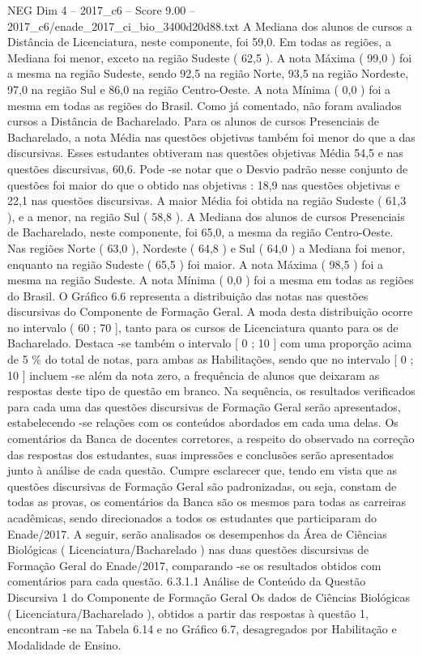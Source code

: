 \begin{textsample}{NEG Dim 4 – 2017\_c6 – Score 9.00 – 2017\_c6/enade\_2017\_ci\_bio\_3400d20d88.txt}
A Mediana dos alunos de cursos a Distância de Licenciatura, neste componente, foi 59,0.
Em todas as regiões, a Mediana foi menor, exceto na região Sudeste ( 62,5 ).
A nota Máxima ( 99,0 ) foi a mesma na região Sudeste, sendo 92,5 na região Norte, 93,5 na região Nordeste, 97,0 na região Sul e 86,0 na região Centro-Oeste.
A nota Mínima ( 0,0 ) foi a mesma em todas as regiões do Brasil.
Como já comentado, não foram avaliados cursos a Distância de Bacharelado.
Para os alunos de cursos Presenciais de Bacharelado, a nota Média nas questões objetivas também foi menor do que a das discursivas.
Esses estudantes obtiveram nas questões objetivas Média 54,5 e nas questões discursivas, 60,6.
Pode -se notar que o Desvio padrão nesse conjunto de questões foi maior do que o obtido nas objetivas : 18,9 nas questões objetivas e 22,1 nas questões discursivas.
A maior Média foi obtida na região Sudeste ( 61,3 ), e a menor, na região Sul ( 58,8 ).
A Mediana dos alunos de cursos Presenciais de Bacharelado, neste componente, foi 65,0, a mesma da região Centro-Oeste.
Nas regiões Norte ( 63,0 ), Nordeste ( 64,8 ) e Sul ( 64,0 ) a Mediana foi menor, enquanto na região Sudeste ( 65,5 ) foi maior.
A nota Máxima ( 98,5 ) foi a mesma na região Sudeste.
A nota Mínima ( 0,0 ) foi a mesma em todas as regiões do Brasil.
O Gráfico 6.6 representa a distribuição das notas nas questões discursivas do Componente de Formação Geral.
A moda desta distribuição ocorre no intervalo ( 60 ; 70 ], tanto para os cursos de Licenciatura quanto para os de Bacharelado.
Destaca -se também o intervalo [ 0 ; 10 ] com uma proporção acima de 5 \% do total de notas, para ambas as Habilitações, sendo que no intervalo [ 0 ; 10 ] incluem -se além da nota zero, a frequência de alunos que deixaram as respostas deste tipo de questão em branco.
Na sequência, os resultados verificados para cada uma das questões discursivas de Formação Geral serão apresentados, estabelecendo -se relações com os conteúdos abordados em cada uma delas.
Os comentários da Banca de docentes corretores, a respeito do observado na correção das respostas dos estudantes, suas impressões e conclusões serão apresentados junto à análise de cada questão.
Cumpre esclarecer que, tendo em vista que as questões discursivas de Formação Geral são padronizadas, ou seja, constam de todas as provas, os comentários da Banca são os mesmos para todas as carreiras acadêmicas, sendo direcionados a todos os estudantes que participaram do Enade/2017.
A seguir, serão analisados os desempenhos da Área de Ciências Biológicas ( Licenciatura/Bacharelado ) nas duas questões discursivas de Formação Geral do Enade/2017, comparando -se os resultados obtidos com comentários para cada questão. 6.3.1.1 Análise de Conteúdo da Questão Discursiva 1 do Componente de Formação Geral Os dados de Ciências Biológicas ( Licenciatura/Bacharelado ), obtidos a partir das respostas à questão 1, encontram -se na Tabela 6.14 e no Gráfico 6.7, desagregados por Habilitação e Modalidade de Ensino.

\end{textsample}
